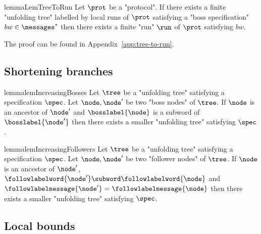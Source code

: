 \begin{restatable}{lemma}{LemTreeToRun}
	\label{lem:tree-to-run}
	Let $\prot$ be a "protocol".
	If there exists a finite "unfolding tree" labelled by local runs of $\prot$ satisfying a "boss specification" $bw \in \messages^*$ then there exists  a finite "run" $\run$ of $\prot$ satisfying $bw$.
\end{restatable}

The proof can be found in Appendix~\ref{app:tree-to-run}.



\subsection{Shortening branches}
\label{sec:decidability-shortening-branches}

\begin{restatable}{lemma}{lemIncreasingBosses}
	\label{lem:increasing-bosses}
	Let $\tree$ be a "unfolding tree" satisfying a specification $\spec$.
	Let $\node, \node'$ be two "boss nodes" of $\tree$.
	If $\node$ is an ancestor of $\node'$ and $\bosslabel{\node}$ is a subword of $\bosslabel{\node'}$ then there exists a smaller "unfolding tree" satisfying $\spec$.  
\end{restatable}

\begin{restatable}{lemma}{lemIncreasingFollowers}
	\label{lem:increasing-followers}
	Let $\tree$ be a "unfolding tree" satisfying a specification $\spec$.
	Let $\node, \node'$ be two "follower nodes" of $\tree$.
	If $\node$ is an ancestor of $\node'$, $\followlabelword{\node'} \subword \followlabelword{\node}$ and $\followlabelmessage{\node'}=\followlabelmessage{\node}$ then there exists a smaller "unfolding tree" satisfying $\spec$. 
\end{restatable}


\subsection{Local bounds}
\label{sec:local-bounds}


